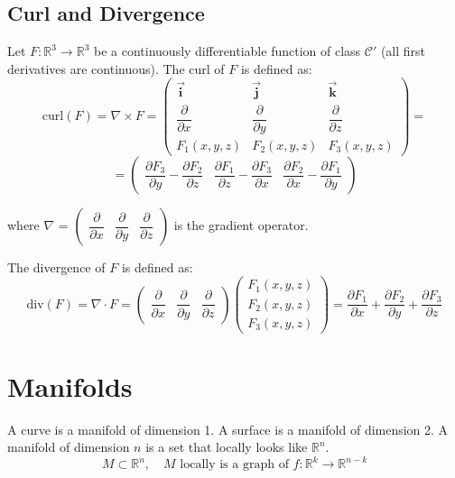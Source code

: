 \documentclass[11pt]{article}
\begin{document}
\subsection{Curl and Divergence}
Let $F : \mathbb{R}^3 \rightarrow \mathbb{R}^3$ be a continuously differentiable function of class $\mathcal{C}'$ (all first derivatives are continuous). The curl of $F$ is defined as:
\[
\text{curl} (F) = \nabla \times F = \begin{pmatrix}
    \overrightarrow{\mathbf{i}} & \overrightarrow{\mathbf{j}} & \overrightarrow{\mathbf{k}} \\
    \dfrac{\partial}{\partial x} & \dfrac{\partial}{\partial y} & \dfrac{\partial}{\partial z} \\
    F_1(x,y,z) & F_2(x,y,z) & F_3(x,y,z)
\end{pmatrix} = \]
\[
= \begin{pmatrix}
    \dfrac{\partial F_3}{\partial y} - \dfrac{\partial F_2}{\partial z} &
    \dfrac{\partial F_1}{\partial z} - \dfrac{\partial F_3}{\partial x} &
    \dfrac{\partial F_2}{\partial x} - \dfrac{\partial F_1}{\partial y}
\end{pmatrix}
\]

where $\nabla$ = $\begin{pmatrix}
    \dfrac{\partial}{\partial x} & \dfrac{\partial}{\partial y} & \dfrac{\partial}{\partial z}
\end{pmatrix}$ is the gradient operator.

The divergence of $F$ is defined as:
\[
\text{div} (F) = \nabla \cdot F = \begin{pmatrix}
    \dfrac{\partial}{\partial x} & \dfrac{\partial}{\partial y} & \dfrac{\partial}{\partial z}
\end{pmatrix} \begin{pmatrix}
    F_1(x,y,z) \\
    F_2(x,y,z) \\
    F_3(x,y,z)
\end{pmatrix} = \dfrac{\partial F_1}{\partial x} + \dfrac{\partial F_2}{\partial y} + \dfrac{\partial F_3}{\partial z}
\]

\section{Manifolds}
A curve is a manifold of dimension 1. A surface is a manifold of dimension 2. A manifold of dimension $n$ is a set that locally looks like $\mathbb{R}^n$.
\[
M \subset \mathbb{R}^n, \quad M \text{ locally is a graph of } f : \mathbb{R}^k \rightarrow \mathbb{R}^{n-k}
\]
\end{document}
